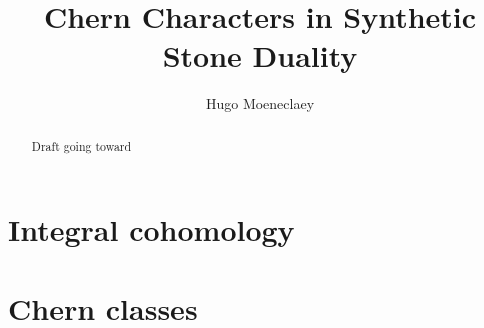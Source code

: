 \documentclass{../util/zariski}
\title{Chern Characters in Synthetic Stone Duality}
\author{Hugo Moeneclaey}
\begin{document}
\maketitle


\begin{abstract}
  Draft going toward
\end{abstract}

\tableofcontents

\section{Integral cohomology}


\section{Chern classes}


\printindex

\printbibliography
\end{document}
